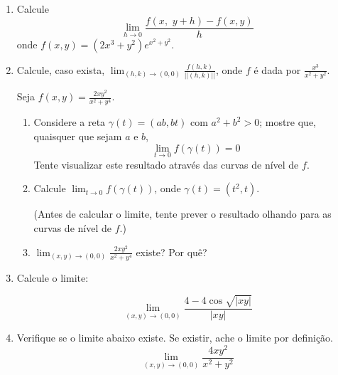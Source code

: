 \documentclass[11pt,a4paper]{article}
\newcommand{\limite}{\displaystyle\lim}
\begin{document}
\begin{enumerate}
	\item Calcule
	$$\limite_{h \to 0} \displaystyle\frac{f(x,\,\, y + h) - f(x,y)}{h}$$
	onde $f(x,y) = (2x^3 + y^2)e^{x^2 + y^2}$.
	
	\item Calcule, caso exista, $\limite_{(h,k) \to (0,0)} \displaystyle\frac{f(h,k)}{||(h,k)||}$, onde $f$ é dada por $\displaystyle\frac{x^3}{x^2 + y^2}$.
	
	 Seja $f(x,y) = \displaystyle\frac{2xy^2}{x^2 + y^4}$.
	\begin{enumerate}
		\item Considere a reta $\gamma (t) = (ab, bt)$ com $a^2 + b^2 > 0$; mostre que, quaisquer que sejam $a$ e $b$, $$\limite_{t \to 0} f(\gamma (t)) = 0$$
		Tente visualizar este resultado através das curvas de nível de $f$.
		
		\item Calcule $\limite_{t \to 0} f(\gamma (t))$, onde $\gamma (t) = (t^2,t)$.
		
		(Antes de calcular o limite, tente prever o resultado olhando para as curvas de nível de $f$.)
		
		\item $\limite_{(x,y) \to (0,0)} \displaystyle\frac{2xy^2}{x^2 + y^4}$ existe? Por quê?
		
	\end{enumerate}
	
		\item Calcule o limite:
		
		$$\limite_{(x,y) \to (0,0)} \displaystyle\frac{4 - 4\cos \sqrt{|xy|}}{|xy|}$$
		
		\item Verifique se o limite abaixo existe. Se existir, ache o limite por definição.
		$$\limite_{(x,y) \to (0,0)} \displaystyle\frac{4xy^2}{x^2 + y^2}$$
		
		
	
	\end{enumerate}
	
\end{document}

